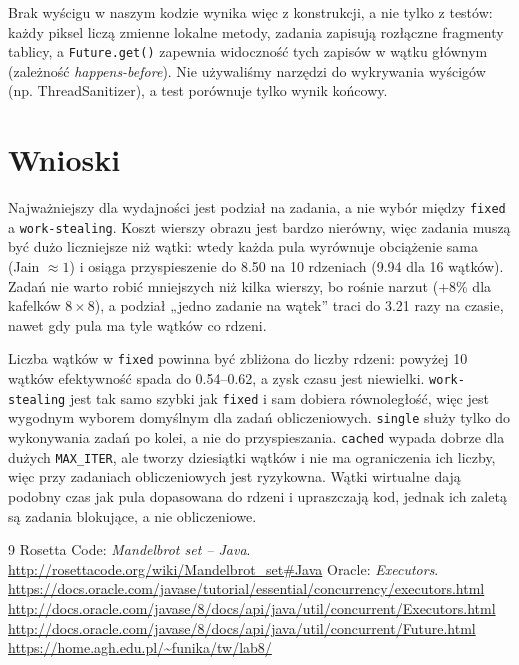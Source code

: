 \documentclass[11pt,a4paper]{article}
\begin{document}
Brak wyścigu w naszym kodzie wynika więc z konstrukcji, a nie tylko z testów: każdy piksel liczą
zmienne lokalne metody, zadania zapisują rozłączne fragmenty tablicy, a \texttt{Future.get()} zapewnia
widoczność tych zapisów w wątku głównym (zależność \textit{happens-before}). Nie używaliśmy narzędzi do wykrywania
wyścigów (np. ThreadSanitizer), a test porównuje tylko wynik końcowy.

\section{Wnioski}
Najważniejszy dla wydajności jest podział na zadania, a nie wybór między \texttt{fixed} a \texttt{work-stealing}.
Koszt wierszy obrazu jest bardzo nierówny, więc zadania muszą być dużo liczniejsze niż wątki:
wtedy każda pula wyrównuje obciążenie sama (Jain $\approx 1$) i osiąga przyspieszenie do \num{8.50} na 10 rdzeniach
(\num{9.94} dla 16 wątków). Zadań nie warto robić mniejszych niż kilka wierszy, bo rośnie narzut
(+\num{8}\% dla kafelków $8 \times 8$), a podział „jedno zadanie na wątek” traci do \num{3.21} razy
na czasie, nawet gdy pula ma tyle wątków co rdzeni.

Liczba wątków w \texttt{fixed} powinna być zbliżona do liczby rdzeni: powyżej 10 wątków efektywność spada
do \num{0.54}--\num{0.62}, a zysk czasu jest niewielki. \texttt{work-stealing} jest tak samo
szybki jak \texttt{fixed} i sam dobiera równoległość, więc jest wygodnym wyborem domyślnym dla zadań obliczeniowych.
\texttt{single} służy tylko do wykonywania zadań po kolei, a nie do przyspieszania. \texttt{cached} wypada dobrze dla
dużych \texttt{MAX\_ITER}, ale tworzy dziesiątki wątków i nie ma ograniczenia ich liczby, więc przy zadaniach
obliczeniowych jest ryzykowna. Wątki wirtualne dają podobny czas jak pula dopasowana do rdzeni
i upraszczają kod, jednak ich zaletą są zadania blokujące, a nie obliczeniowe.

\begin{thebibliography}{9}
     Rosetta Code: \textit{Mandelbrot set -- Java}. \url{http://rosettacode.org/wiki/Mandelbrot_set\#Java}
     Oracle: \textit{Executors}. \url{https://docs.oracle.com/javase/tutorial/essential/concurrency/executors.html}
     \url{http://docs.oracle.com/javase/8/docs/api/java/util/concurrent/Executors.html}
     \url{http://docs.oracle.com/javase/8/docs/api/java/util/concurrent/Future.html}
     \url{https://home.agh.edu.pl/~funika/tw/lab8/}
\end{thebibliography}
\end{document}
